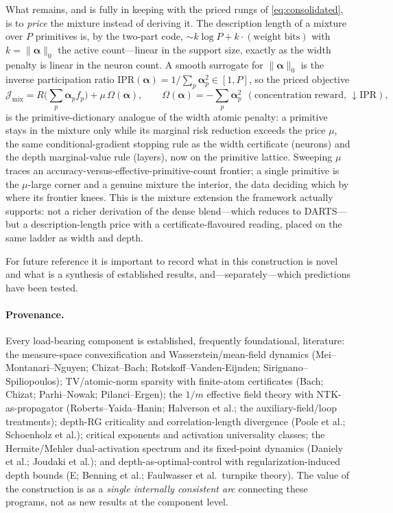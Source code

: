 \documentclass[11pt]{article}
\theoremstyle{definition}
\newcommand{\alphapar}{\bm{\alpha}}
\begin{document}
What remains, and is fully in keeping with the priced rungs of \eqref{eq:consolidated}, is to
\emph{price} the mixture instead of deriving it. The description length of a mixture over $P$ primitives
is, by the two-part code, $\sim k\log P + k\cdot(\text{weight bits})$ with $k=\|\alphapar\|_0$ the
active count---linear in the support size, exactly as the width penalty is linear in the neuron count. A
smooth surrogate for $\|\alphapar\|_0$ is the inverse participation ratio
$\mathrm{IPR}(\alphapar)=1/\sum_p\alphapar_p^{2}\in[1,P]$, so the priced objective
\begin{equation}
\mathcal J_{\mathrm{mix}}=R\Big(\textstyle\sum_p\alphapar_p f_p\Big)+\mu\,\Omega(\alphapar),
\qquad \Omega(\alphapar)=-\textstyle\sum_p\alphapar_p^{2}\ \ (\text{concentration reward, }\downarrow\mathrm{IPR}),
\label{eq:sparsity-priced}
\end{equation}
is the primitive-dictionary analogue of the width atomic penalty: a primitive stays in the mixture only
while its marginal risk reduction exceeds the price $\mu$, the same conditional-gradient stopping rule as
the width certificate (neurons) and the depth marginal-value rule (layers), now on the primitive lattice.
Sweeping $\mu$ traces an accuracy-versus-effective-primitive-count frontier; a single primitive is the
$\mu$-large corner and a genuine mixture the interior, the data deciding which by where its frontier
knees. This is the mixture extension the framework actually supports: not a richer derivation of the
dense blend---which reduces to DARTS---but a description-length price with a certificate-flavoured reading,
placed on the same ladder as width and depth.



For future reference it is important to record what in this construction is novel and what
is a synthesis of established results, and---separately---which predictions have been tested.

\paragraph{Provenance.} Every load-bearing component is established, frequently foundational,
literature: the measure-space convexification and Wasserstein/mean-field dynamics
(Mei--Montanari--Nguyen; Chizat--Bach; Rotskoff--Vanden-Eijnden; Sirignano--Spiliopoulos);
TV/atomic-norm sparsity with finite-atom certificates (Bach; Chizat; Parhi--Nowak;
Pilanci--Ergen); the $1/m$ effective field theory with NTK-as-propagator
(Roberts--Yaida--Hanin; Halverson et al.; the auxiliary-field/loop treatments);
depth-RG criticality and correlation-length divergence (Poole et al.; Schoenholz et al.);
critical exponents and activation universality classes; the Hermite/Mehler dual-activation
spectrum and its fixed-point dynamics (Daniely et al.; Joudaki et al.); and
depth-as-optimal-control with regularization-induced depth bounds
(E; Benning et al.; Faulwasser et al.\ turnpike theory). The value of the construction is as
a \emph{single internally consistent arc} connecting these programs, not as new results at
the component level.
\end{document}
